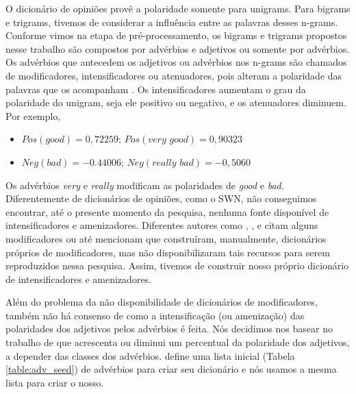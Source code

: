 O dicionário de opiniões provê a polaridade somente para unigrams. Para bigrams e trigrams, tivemos de considerar a influência entre as palavras desses n-grams. Conforme vimos na etapa de pré-processamento, os bigrams e trigrams propostos nesse trabalho são compostos por advérbios e adjetivos ou somente por advérbios. Os advérbios que antecedem os adjetivos ou advérbios nos n-grams são chamados de modificadores, intensificadores ou atenuadores, pois alteram a polaridade das palavras que os acompanham \cite{voll2007not}. Os intensificadores aumentam o grau da polaridade do unigram, seja ele positivo ou negativo, e os atenuadores diminuem. Por exemplo, 

\begin{itemize}
\item \label{itm:very_exem} $Pos(\textit{good}) = 0,72259$; $Pos(\textit{very good}) = 0,90323$
\item \label{itm:really_exem} $Neg(\textit{bad}) = -0.44006$; $Neg(\textit{really bad}) = -0,5060$
\end{itemize}

Os advérbios \textit{very} e \textit{really} modificam as polaridades de \textit{good} e \textit{bad}. Diferentemente de dicionários de opiniões, como o SWN, não conseguimos encontrar, até o presente momento da pesquisa, nenhuma fonte disponível de intensificadores e amenizadores. Diferentes autores como , ,  e  citam alguns modificadores ou até mencionam que construíram, manualmente, dicionários próprios de modificadores, mas não disponibilizaram tais recursos para serem reproduzidos nessa pesquisa. Assim, tivemos de construir nosso próprio dicionário de intensificadores e amenizadores. 

Além do problema da não disponibilidade de dicionários de modificadores, também não há consenso de como a intensificação (ou amenização) das polaridades dos adjetivos pelos advérbios é feita. Nós decidimos nos basear no trabalho de  que acrescenta ou diminui um percentual da polaridade dos adjetivos, a depender das classes dos advérbios.  define uma lista inicial (Tabela \ref{table:adv_seed}) de advérbios para criar seu dicionário e nós usamos a mesma lista para criar o nosso.

